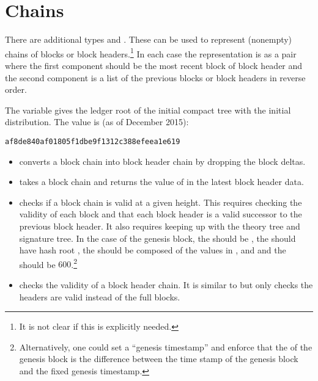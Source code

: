 \section{Chains}

There are additional types
{}
and 
{}.
These can be used to represent (nonempty) chains of blocks or block headers.\footnote{It is not clear if this is explicitly needed.}
In each case the representation is as a pair
where the first component should be the most recent block of block header
and the second component is a list of the previous blocks or block headers
in reverse order.

The variable {} gives the ledger root of the initial compact tree
with the initial distribution. The value is (as of December 2015):
\begin{verbatim}
af8de840af01805f1dbe9f1312c388efeea1e619
\end{verbatim}

\begin{itemize}
\item {} converts a block chain into block header chain by dropping the block deltas.
\item {} takes a block chain and returns the value of {} in the latest block header data.
\item {} checks if a block chain is valid at a given height.
This requires checking the validity of each block and that each block header is a valid
successor to the previous block header. It also requires keeping up with the
theory tree and signature tree.
In the case of the genesis block, the {} should be {},
the {} should have hash root {},
the {} should be composed of the values in {},
{} and {}
and the {} should be $600$.\footnote{Alternatively, one could set a ``genesis timestamp'' and enforce that the {} of the genesis block is the difference between the time stamp of the genesis block and the fixed genesis timestamp.}
\item {} checks the validity of a block header chain.
It is similar to {} but only checks the headers are valid
instead of the full blocks.
\end{itemize}
